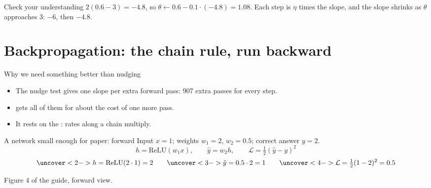 \documentclass[aspectratio=169,11pt,t,\primeropts]{beamer}
\begin{document}
\begin{frame}{Check your understanding}
  {$2(0.6 - 3) = -4.8$, so $\theta \leftarrow 0.6 - 0.1 \cdot (-4.8) = 1.08$. Each step is
    $\eta$ times the slope, and the slope shrinks as $\theta$ approaches $3$: $-6$, then
    $-4.8$.}
\end{frame}

\section{Backpropagation: the chain rule, run backward}

\begin{frame}{Why we need something better than nudging}
  \begin{itemize}
    \item The nudge test gives one slope per extra forward pass: 907 extra passes for every step.
    \item {} gets all of them for about the cost of one more pass.
    \item It rests on the : rates along a chain multiply.
  \end{itemize}
  \vspace{3mm}
  \begin{center}
  \end{center}
\end{frame}

\begin{frame}{A network small enough for paper: forward}
  Input $x = 1$; weights $w_1 = 2$, $w_2 = 0.5$; correct answer $y = 2$.
  \vspace{-2mm}
  \[ h = \text{ReLU}(w_1 x), \qquad \hat{y} = w_2 h, \qquad
    \mathcal{L} = \tfrac{1}{2}(\hat{y} - y)^2 \]
  \vspace{-4mm}
  \vspace{-3mm}
  \[
    \uncover<2->{h = \text{ReLU}(2 \cdot 1) = 2}\qquad
    \uncover<3->{\hat{y} = 0.5 \cdot 2 = 1}\qquad
    \uncover<4->{\mathcal{L} = \tfrac{1}{2}(1 - 2)^2 = 0.5}
  \]
  {\footnotesize\color{primerMuted}Figure 4 of the guide, forward view.\par}
\end{frame}
\end{document}
